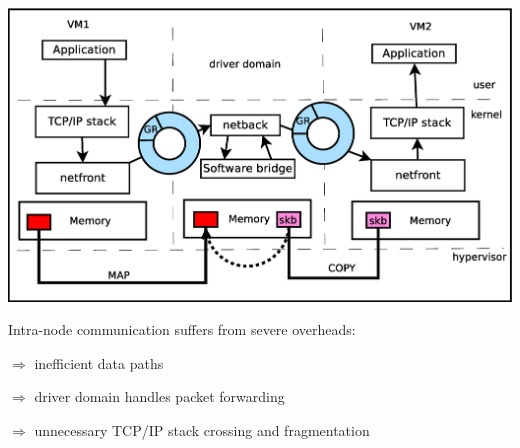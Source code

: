 \documentclass[a0paper,portrait,final]{baposter}
\begin{document}
\begin{poster}
{%
\begin{center}
\includegraphics[width=\linewidth]{figures/netfront_netback.eps}
\end{center}
Intra-node communication suffers from severe overheads:

$\Rightarrow$ inefficient data paths

$\Rightarrow$ driver domain handles packet forwarding

$\Rightarrow$ unnecessary TCP/IP stack crossing and fragmentation

\vspace{0.5em}

}

\end{poster}
\end{document}
